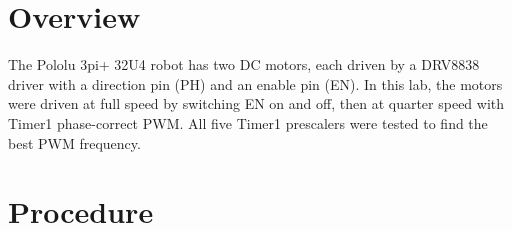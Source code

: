 \documentclass[11pt]{article}
\title{\labtitle \\[0.3em] \large \labdate}
\author{\studentname \\ \small \course{} \,}
\date{}
\begin{document}
\maketitle

\section{Overview}
The Pololu 3pi+ 32U4 robot has two DC motors, each driven by a DRV8838 driver with a direction pin (PH) and an enable pin (EN). In this lab, the motors were driven at full speed by switching EN on and off, then at quarter speed with Timer1 phase-correct PWM. All five Timer1 prescalers were tested to find the best PWM frequency.

\section{Procedure}
\end{document}
